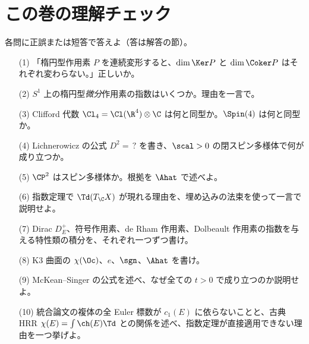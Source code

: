 \section{この巻の理解チェック}\label{sec:check}
各問に正誤または短答で答えよ（答は解答の節）。
\begin{enumerate}
\item[(1)] 「楕円型作用素 $P$ を連続変形すると、$\dim\Ker P$ と $\dim\Coker P$ はそれぞれ変わらない。」正しいか。
\item[(2)] $S^1$ 上の楕円型\emph{微分}作用素の指数はいくつか。理由を一言で。
\item[(3)] Clifford 代数 $\Cl_4=\Cl(\R^4)\otimes\C$ は何と同型か。$\Spin(4)$ は何と同型か。
\item[(4)] Lichnerowicz の公式 $D^2=\,?$ を書き、$\scal>0$ の閉スピン多様体で何が成り立つか。
\item[(5)] $\CP^2$ はスピン多様体か。根拠を $\Ahat$ で述べよ。
\item[(6)] 指数定理で $\Td(T_{\C}X)$ が現れる理由を、埋め込みの法束を使って一言で説明せよ。
\item[(7)] Dirac $D_E^+$、符号作用素、de Rham 作用素、Dolbeault 作用素の指数を与える特性類の積分を、それぞれ一つずつ書け。
\item[(8)] K3 曲面の $\chi(\Oc)$、$e$、$\sgn$、$\Ahat$ を書け。
\item[(9)] McKean--Singer の公式を述べ、なぜ全ての $t>0$ で成り立つのか説明せよ。
\item[(10)] 統合論文の複体の全 Euler 標数が $c_1(E)$ に依らないことと、古典 HRR $\chi(E)=\int\ch(E)\Td$ との関係を述べ、指数定理が直接適用できない理由を一つ挙げよ。
\end{enumerate}
